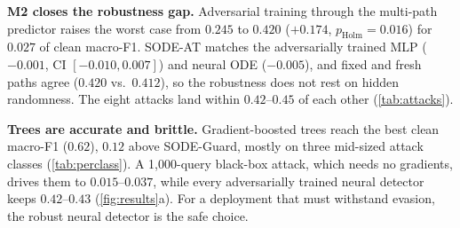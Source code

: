 \documentclass{article}
\theoremstyle{definition}
\begin{document}
\textbf{M2 closes the robustness gap.} Adversarial training through the
multi-path predictor raises the worst case from $0.245$ to $0.420$ ($+0.174$,
$p_{\mathrm{Holm}}=0.016$) for $0.027$ of clean macro-F1. SODE-AT matches the
adversarially trained MLP ($-0.001$, CI $[-0.010,0.007]$) and neural ODE
($-0.005$), and fixed and fresh paths agree ($0.420$ vs.\ $0.412$), so the
robustness does not rest on hidden randomness. The eight attacks land within
$0.42$--$0.45$ of each other (\cref{tab:attacks}).

\textbf{Trees are accurate and brittle.} Gradient-boosted trees reach the best
clean macro-F1 ($0.62$), $0.12$ above SODE-Guard, mostly on three mid-sized
attack classes (\cref{tab:perclass}). A 1{,}000-query black-box attack, which
needs no gradients, drives them to $0.015$--$0.037$, while every adversarially
trained neural detector keeps $0.42$--$0.43$ (\cref{fig:results}a). For a
deployment that must withstand evasion, the robust neural detector is the safe
choice.
\end{document}

